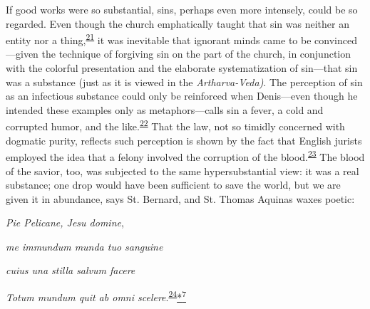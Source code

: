 If good works were so substantial, sins, perhaps even more intensely,
could be so regarded. Even though the church emphatically taught that
sin was neither an entity nor a
thing,\textsuperscript{\protect\hypertarget{17_Chapter_Ten__THE_FAILURE_OF_IMAG.xhtmlux5cux23id_694}{\protect\hyperlink{23_NOTES.xhtmlux5cux23id_695}{21}}}
it was inevitable that ignorant minds came to be convinced---given the
technique of forgiving sin on the part of the church, in conjunction
with the colorful presentation and the elaborate systematization of
sin---that sin was a substance (just as it is viewed in the
\emph{Artharva-Veda)}. The perception of sin as an infectious substance
could only be reinforced when Denis---even though he intended these
examples only as metaphors---calls sin a fever, a cold and corrupted
humor, and the
like.\textsuperscript{\protect\hypertarget{17_Chapter_Ten__THE_FAILURE_OF_IMAG.xhtmlux5cux23id_692}{\protect\hyperlink{23_NOTES.xhtmlux5cux23id_693}{22}}}
That the law, not so timidly concerned with dogmatic purity, reflects
such perception is shown by the fact that English jurists employed the
idea that a felony involved the corruption of the
\protect\hypertarget{17_Chapter_Ten__THE_FAILURE_OF_IMAG.xhtmlux5cux23page_256}{}{}blood.\textsuperscript{\protect\hypertarget{17_Chapter_Ten__THE_FAILURE_OF_IMAG.xhtmlux5cux23id_690}{\protect\hyperlink{23_NOTES.xhtmlux5cux23id_691}{23}}}
The blood of the savior, too, was subjected to the same hypersubstantial
view: it was a real substance; one drop would have been sufficient to
save the world, but we are given it in abundance, says St. Bernard, and
St. Thomas Aquinas waxes poetic:

\emph{Pie Pelicane, Jesu domine},

\emph{me immundum munda tuo sanguine}

\emph{cuius una stilla salvum facere}

\emph{Totum mundum quit ab omni
scelere}.\textsuperscript{\protect\hypertarget{17_Chapter_Ten__THE_FAILURE_OF_IMAG.xhtmlux5cux23id_688}{\protect\hyperlink{23_NOTES.xhtmlux5cux23id_689}{24}}}\protect\hypertarget{17_Chapter_Ten__THE_FAILURE_OF_IMAG.xhtmlux5cux23id_2591}{\protect\hyperlink{23_NOTES.xhtmlux5cux23id_2592}{*\textsuperscript{7}}}

